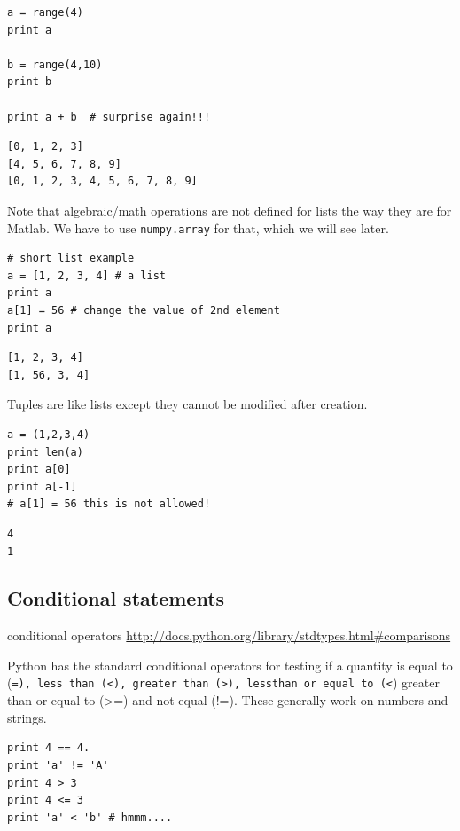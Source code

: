 \documentclass[11pt]{article}
\begin{document}
\begin{verbatim}
a = range(4)
print a

b = range(4,10)
print b

print a + b  # surprise again!!!
\end{verbatim}

\begin{verbatim}
[0, 1, 2, 3]
[4, 5, 6, 7, 8, 9]
[0, 1, 2, 3, 4, 5, 6, 7, 8, 9]
\end{verbatim}

Note that algebraic/math operations are not defined for lists the way they are for Matlab. We have to use \texttt{numpy.array} for that, which we will see later.

\begin{verbatim}
# short list example
a = [1, 2, 3, 4] # a list
print a
a[1] = 56 # change the value of 2nd element
print a
\end{verbatim}

\begin{verbatim}
[1, 2, 3, 4]
[1, 56, 3, 4]
\end{verbatim}

Tuples are like lists except they cannot be modified after creation.

\begin{verbatim}
a = (1,2,3,4)
print len(a)
print a[0]
print a[-1]
# a[1] = 56 this is not allowed!
\end{verbatim}

\begin{verbatim}
4
1

\end{verbatim}


\subsection{Conditional statements}
\label{sec-3-4}
conditional operators \url{http://docs.python.org/library/stdtypes.html#comparisons}

Python has the standard conditional operators for testing if a quantity is equal to (\texttt{=), less than (<), greater than (>), lessthan or equal to (<}) greater than or equal to (>=) and not equal (!=). These generally work on numbers and strings.

\begin{verbatim}
print 4 == 4.
print 'a' != 'A'
print 4 > 3
print 4 <= 3
print 'a' < 'b' # hmmm....
\end{verbatim}
\end{document}
